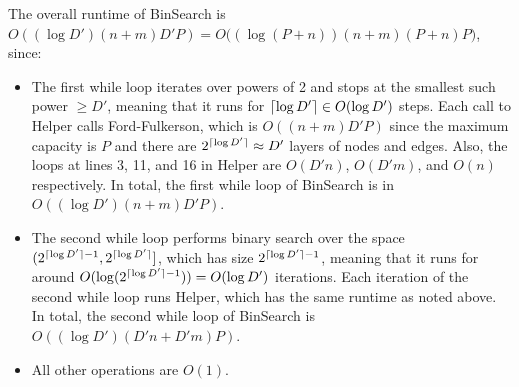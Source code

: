 \documentclass[11pt]{article}
\DeclarePairedDelimiter{\ceil}{\lceil}{\rceil}
\begin{document}

The overall runtime of BinSearch is $O((\log D')(n+m)D'P)=O \Big( (\log(P+n))(n+m)(P+n)P \Big)$, since:

\begin{itemize}
    \item The first while loop iterates over powers of 2 and stops at the smallest such power $\geq D'$, meaning that it runs for $\ceil{\log D'}\in O(\log D')$ steps. Each call to Helper calls Ford-Fulkerson, which is $O((n+m)D'P)$ since the maximum capacity is $P$ and there are $2^{\ceil{\log D'}}\approx D'$ layers of nodes and edges. Also, the loops at lines 3, 11, and 16 in Helper are $O(D'n)$, $O(D'm)$, and $O(n)$ respectively. In total, the first while loop of BinSearch is in $O((\log D')(n+m)D'P)$.
    \item The second while loop performs binary search over the space $(2^{\ceil{\log D'}-1}, 2^{\ceil{\log D'}}]$, which has size $2^{\ceil{\log D'}-1}$, meaning that it runs for around $O(\log(2^{\ceil{\log D'}-1}))=O(\log D')$ iterations. Each iteration of the second while loop runs Helper, which has the same runtime as noted above. In total, the second while loop of BinSearch is $O((\log D')(D'n+D'm)P)$.
    \item All other operations are $O(1)$.
\end{itemize}
\end{document}
